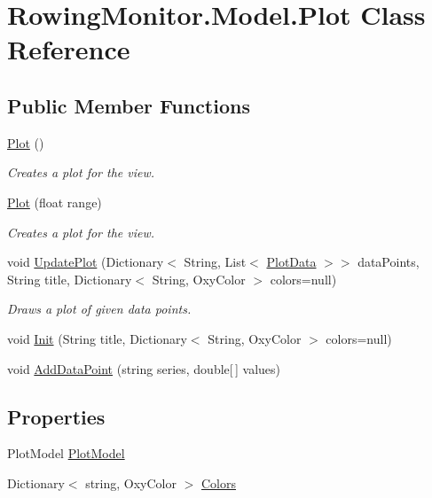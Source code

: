 \hypertarget{class_rowing_monitor_1_1_model_1_1_plot}{}\section{Rowing\+Monitor.\+Model.\+Plot Class Reference}
\label{class_rowing_monitor_1_1_model_1_1_plot}
\subsection*{Public Member Functions}
\begin{DoxyCompactItemize}
\item 
\hyperlink{class_rowing_monitor_1_1_model_1_1_plot_a950ad596730f1ff80a5998f16a4c0d3c}{Plot} ()
\begin{DoxyCompactList}\small\item\em Creates a plot for the view. \end{DoxyCompactList}\item 
\hyperlink{class_rowing_monitor_1_1_model_1_1_plot_a12760bee76f583deb2741bc223be33e2}{Plot} (float range)
\begin{DoxyCompactList}\small\item\em Creates a plot for the view. \end{DoxyCompactList}\item 
void \hyperlink{class_rowing_monitor_1_1_model_1_1_plot_a8adb8a568e1c387863ec524633008d36}{Update\+Plot} (Dictionary$<$ String, List$<$ \hyperlink{struct_rowing_monitor_1_1_model_1_1_plot_data}{Plot\+Data} $>$$>$ data\+Points, String title, Dictionary$<$ String, Oxy\+Color $>$ colors=null)
\begin{DoxyCompactList}\small\item\em Draws a plot of given data points. \end{DoxyCompactList}\item 
void \hyperlink{class_rowing_monitor_1_1_model_1_1_plot_a408af0095ce2ead5b7d897915a378340}{Init} (String title, Dictionary$<$ String, Oxy\+Color $>$ colors=null)
\item 
void \hyperlink{class_rowing_monitor_1_1_model_1_1_plot_a7502c1cc303bfefb6de6b08efb874b1b}{Add\+Data\+Point} (string series, double\mbox{[}$\,$\mbox{]} values)
\end{DoxyCompactItemize}
\subsection*{Properties}
\begin{DoxyCompactItemize}
\item 
Plot\+Model \hyperlink{class_rowing_monitor_1_1_model_1_1_plot_a702a4f703d9a9452dade1f19e91fc7a4}{Plot\+Model}
\item 
Dictionary$<$ string, Oxy\+Color $>$ \hyperlink{class_rowing_monitor_1_1_model_1_1_plot_af5c811e7e98de0927650caede84921a5}{Colors}
\end{DoxyCompactItemize}


